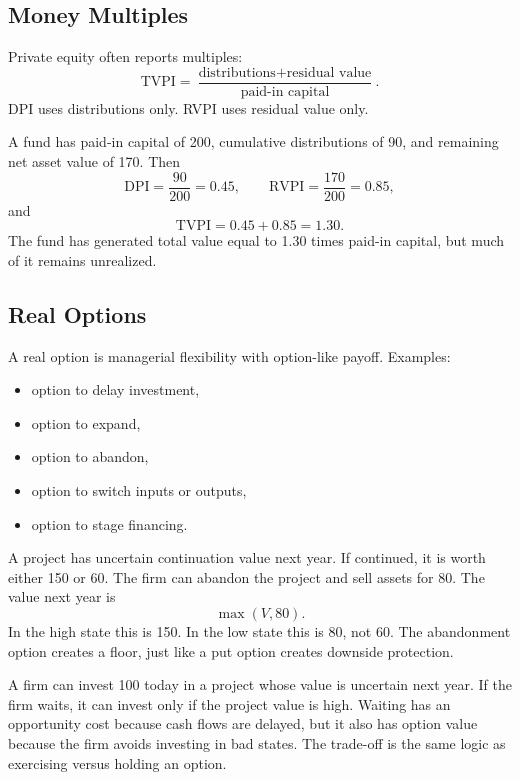 \subsection{Money Multiples}

Private equity often reports multiples:
\[
    \mathrm{TVPI}
    =
    \frac{\text{distributions}+\text{residual value}}{\text{paid-in capital}}.
\]
DPI uses distributions only. RVPI uses residual value only.

\begin{exmp}
A fund has paid-in capital of 200, cumulative distributions of 90, and remaining
net asset value of 170. Then
\[
    \mathrm{DPI}=\frac{90}{200}=0.45,
    \qquad
    \mathrm{RVPI}=\frac{170}{200}=0.85,
\]
and
\[
    \mathrm{TVPI}=0.45+0.85=1.30.
\]
The fund has generated total value equal to 1.30 times paid-in capital, but much
of it remains unrealized.
\end{exmp}

\subsection{Real Options}

A real option is managerial flexibility with option-like payoff. Examples:
\begin{itemize}
    \item option to delay investment,
    \item option to expand,
    \item option to abandon,
    \item option to switch inputs or outputs,
    \item option to stage financing.
\end{itemize}

\begin{exmp}
A project has uncertain continuation value next year. If continued, it is worth
either 150 or 60. The firm can abandon the project and sell assets for 80. The
value next year is
\[
    \max(V,80).
\]
In the high state this is 150. In the low state this is 80, not 60. The
abandonment option creates a floor, just like a put option creates downside
protection.
\end{exmp}

\begin{exmp}
A firm can invest 100 today in a project whose value is uncertain next year. If
the firm waits, it can invest only if the project value is high. Waiting has an
opportunity cost because cash flows are delayed, but it also has option value
because the firm avoids investing in bad states. The trade-off is the same logic
as exercising versus holding an option.
\end{exmp}

